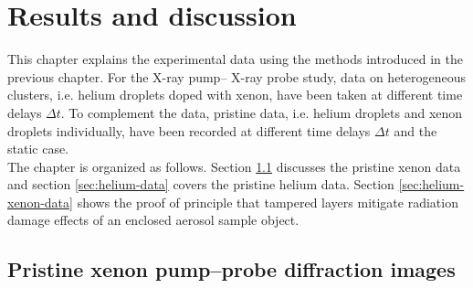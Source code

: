 \chapter{Results and discussion}\label{ch:results}
This chapter explains the experimental data using the methods introduced in the previous chapter. For the X-ray pump-- X-ray probe study, data on heterogeneous clusters, i.e. helium droplets doped with xenon, have been taken at different time delays $\Delta t$. To complement the data, pristine data, i.e. helium droplets and xenon droplets individually, have been recorded at different time delays $\Delta t$ and the static case.\\
The chapter is organized as follows. Section \ref{sec:xenon-data} discusses the pristine xenon data and section \ref{sec:helium-data} covers the pristine helium data. Section \ref{sec:helium-xenon-data} shows the proof of principle that tampered layers mitigate radiation damage effects of an enclosed aerosol sample object.
%
%
%
\section{Pristine xenon pump--probe diffraction images}\label{sec:xenon-data}
